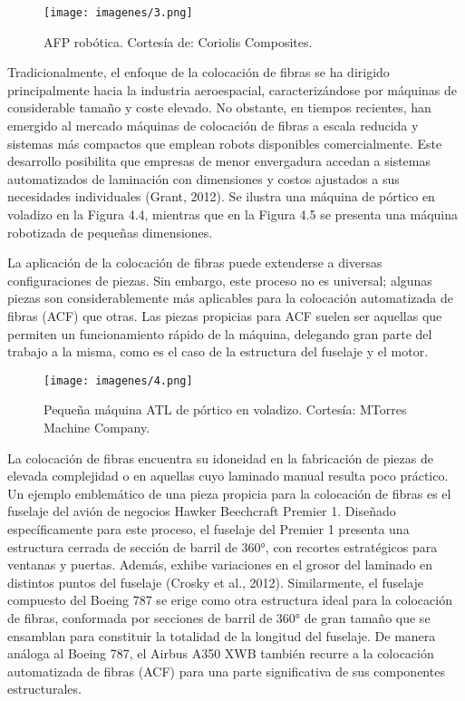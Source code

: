 \begin{enumerate}[label=\arabic*.]
\begin{figure}[h]
    \centering
    \texttt{[image: imagenes/3.png]}
    \caption{AFP robótica. Cortesía de: Coriolis Composites.}
    \label{fig:enter-label}
\end{figure}

Tradicionalmente, el enfoque de la colocación de fibras se ha dirigido principalmente hacia la industria aeroespacial, caracterizándose por máquinas de considerable tamaño y coste elevado. No obstante, en tiempos recientes, han emergido al mercado máquinas de colocación de fibras a escala reducida y sistemas más compactos que emplean robots disponibles comercialmente. Este desarrollo posibilita que empresas de menor envergadura accedan a sistemas automatizados de laminación con dimensiones y costos ajustados a sus necesidades individuales (Grant, 2012). Se ilustra una máquina de pórtico en voladizo en la Figura 4.4, mientras que en la Figura 4.5 se presenta una máquina robotizada de pequeñas dimensiones.

La aplicación de la colocación de fibras puede extenderse a diversas configuraciones de piezas. Sin embargo, este proceso no es universal; algunas piezas son considerablemente más aplicables para la colocación automatizada de fibras (ACF) que otras. Las piezas propicias para ACF suelen ser aquellas que permiten un funcionamiento rápido de la máquina, delegando gran parte del trabajo a la misma, como es el caso de la estructura del fuselaje y el motor.
\begin{figure}[h]
    \centering
    \texttt{[image: imagenes/4.png]}
    \caption{Pequeña máquina ATL de pórtico en voladizo. Cortesía: MTorres Machine Company.}
    \label{fig:enter-label}
\end{figure}
La colocación de fibras encuentra su idoneidad en la fabricación de piezas de elevada complejidad o en aquellas cuyo laminado manual resulta poco práctico. Un ejemplo emblemático de una pieza propicia para la colocación de fibras es el fuselaje del avión de negocios Hawker Beechcraft Premier 1. Diseñado específicamente para este proceso, el fuselaje del Premier 1 presenta una estructura cerrada de sección de barril de 360°, con recortes estratégicos para ventanas y puertas. Además, exhibe variaciones en el grosor del laminado en distintos puntos del fuselaje (Crosky et al., 2012). Similarmente, el fuselaje compuesto del Boeing 787 se erige como otra estructura ideal para la colocación de fibras, conformada por secciones de barril de 360° de gran tamaño que se ensamblan para constituir la totalidad de la longitud del fuselaje. De manera análoga al Boeing 787, el Airbus A350 XWB también recurre a la colocación automatizada de fibras (ACF) para una parte significativa de sus componentes estructurales.


\end{enumerate}
